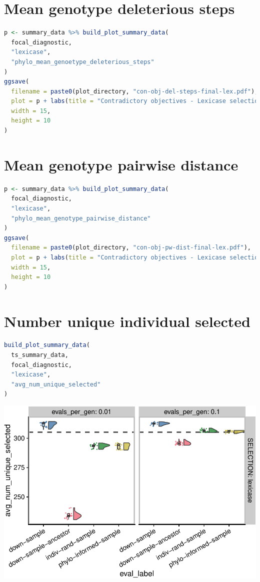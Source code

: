 \documentclass[
]{book}
\begin{document}
\hypertarget{mean-genotype-deleterious-steps}{%
\section{Mean genotype deleterious steps}\label{mean-genotype-deleterious-steps}}

\begin{lstlisting}[language=R]
p <- summary_data %>% build_plot_summary_data(
  focal_diagnostic,
  "lexicase",
  "phylo_mean_genoetype_deleterious_steps"
)
ggsave(
  filename = paste0(plot_directory, "con-obj-del-steps-final-lex.pdf"),
  plot = p + labs(title = "Contradictory objectives - Lexicase selection"),
  width = 15,
  height = 10
)
\end{lstlisting}

\hypertarget{mean-genotype-pairwise-distance}{%
\section{Mean genotype pairwise distance}\label{mean-genotype-pairwise-distance}}

\begin{lstlisting}[language=R]
p <- summary_data %>% build_plot_summary_data(
  focal_diagnostic,
  "lexicase",
  "phylo_mean_genotype_pairwise_distance"
)
ggsave(
  filename = paste0(plot_directory, "con-obj-pw-dist-final-lex.pdf"),
  plot = p + labs(title = "Contradictory objectives - Lexicase selection"),
  width = 15,
  height = 10
)
\end{lstlisting}

\hypertarget{number-unique-individual-selected-1}{%
\section{Number unique individual selected}\label{number-unique-individual-selected-1}}

\begin{lstlisting}[language=R]
build_plot_summary_data(
  ts_summary_data,
  focal_diagnostic,
  "lexicase",
  "avg_num_unique_selected"
)
\end{lstlisting}

\includegraphics{phylogeny-informed-subsampling-supplemental_files/figure-latex/unnamed-chunk-45-1.pdf}
\end{document}
